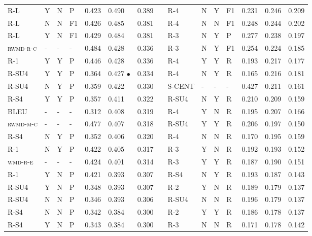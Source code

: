 \documentclass[11pt,a4paper]{article}
\newcommand{\wmd}{\textsc{wmd}\xspace}
\begin{document}
\begin{table}[]
{\begin{tabular}{lllllllllllllll}
\textsc{R-L} & Y & N & P & 0.423 & 0.490 & 0.389 &  & \textsc{R-4} & N & Y & F1 & 0.231 & 0.246 & 0.209 \\
\textsc{R-L} & N & N & F1 & 0.426 & 0.485 & 0.381 &  & \textsc{R-4} & N & N & F1 & 0.248 & 0.244 & 0.202 \\
\textsc{R-L} & Y & N & F1 & 0.429 & 0.484 & 0.381 &  & \textsc{R-3} & N & Y & P & 0.277 & 0.238 & 0.197 \\
\textsc{rwmd-r-c} & - & - & - & 0.484 & 0.428 & 0.336 &  & \textsc{R-3} & N & Y & F1 & 0.254 & 0.224 & 0.185 \\
\textsc{R-1} & Y & Y & P & 0.446 & 0.428 & 0.336 &  & \textsc{R-4} & Y & Y & R & 0.193 & 0.217 & 0.177 \\
\textsc{R-SU4} & Y & Y & P & 0.364 & 0.427 $\bullet$ & 0.334 &  & \textsc{R-4} & N & Y & R & 0.165 & 0.216 & 0.181 \\
\textsc{R-SU4} & N & Y & P & 0.359 & 0.422 & 0.330 &  & \textsc{S-CENT} & - & - & - & 0.427 & 0.211 & 0.161 \\
\textsc{R-S4} & Y & Y & P & 0.357 & 0.411 & 0.322 &  & \textsc{R-SU4} & N & Y & R & 0.210 & 0.209 & 0.159 \\
\textsc{BLEU} & - & - & - & 0.312 & 0.408 & 0.319 &  & \textsc{R-4} & Y & N & R & 0.195 & 0.207 & 0.166 \\
\textsc{rwmd-m-c} & - & - & - & 0.477 & 0.407 & 0.318 &  & \textsc{R-SU4} & Y & Y & R & 0.206 & 0.197 & 0.150 \\
\textsc{R-S4} & N & Y & P & 0.352 & 0.406 & 0.320 &  & \textsc{R-4} & N & N & R & 0.170 & 0.195 & 0.159 \\
\textsc{R-1} & N & Y & P & 0.422 & 0.405 & 0.317 &  & \textsc{R-3} & Y & N & R & 0.192 & 0.193 & 0.152 \\
\textsc{\wmd-r-e} & - & - & - & 0.424 & 0.401 & 0.314 &  & \textsc{R-3} & Y & Y & R & 0.187 & 0.190 & 0.151 \\
\textsc{R-1} & Y & N & P & 0.421 & 0.393 & 0.307 &  & \textsc{R-S4} & N & Y & R & 0.193 & 0.187 & 0.143 \\
\textsc{R-SU4} & Y & N & P & 0.348 & 0.393 & 0.307 &  & \textsc{R-2} & Y & N & R & 0.189 & 0.179 & 0.137 \\
\textsc{R-SU4} & N & N & P & 0.346 & 0.393 & 0.306 &  & \textsc{R-SU4} & N & N & R & 0.196 & 0.179 & 0.137 \\
\textsc{R-S4} & N & N & P & 0.342 & 0.384 & 0.300 &  & \textsc{R-2} & Y & Y & R & 0.186 & 0.178 & 0.137 \\
\textsc{R-S4} & Y & N & P & 0.343 & 0.384 & 0.300 &  & \textsc{R-3} & N & N & R & 0.171 & 0.178 & 0.142 \\

\end{tabular}}
\end{table}
\end{document}
